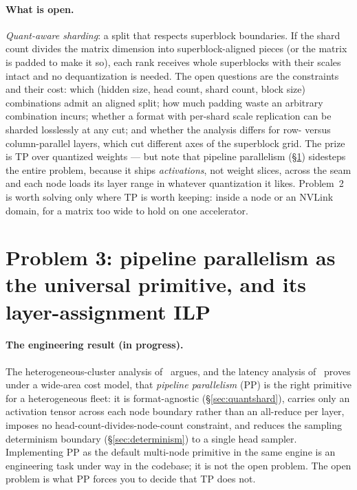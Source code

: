\documentclass[11pt]{article}
\begin{document}
\paragraph{What is open.} \emph{Quant-aware sharding}: a split that respects superblock boundaries. If the
shard count divides the matrix dimension into superblock-aligned pieces (or the matrix is padded to make
it so), each rank receives whole superblocks with their scales intact and no dequantization is needed. The
open questions are the constraints and their cost: which (hidden size, head count, shard count, block size)
combinations admit an aligned split; how much padding waste an arbitrary combination incurs; whether a
format with per-shard scale replication can be sharded losslessly at any cut; and whether the analysis
differs for row- versus column-parallel layers, which cut different axes of the superblock grid. The prize
is TP over quantized weights --- but note that pipeline parallelism (\S\ref{sec:pp}) sidesteps the entire
problem, because it ships \emph{activations}, not weight slices, across the seam and each node loads its
layer range in whatever quantization it likes. Problem~2 is worth solving only where TP is worth keeping:
inside a node or an NVLink domain, for a matrix too wide to hold on one accelerator.

\section{Problem 3: pipeline parallelism as the universal primitive, and its layer-assignment ILP}
\label{sec:pp}

\paragraph{The engineering result (in progress).} The heterogeneous-cluster analysis of~\cite{het} argues,
and the latency analysis of~\cite{latency} proves under a wide-area cost model, that \emph{pipeline
parallelism} (PP) is the right primitive for a heterogeneous fleet: it is format-agnostic (\S\ref{sec:quantshard}),
carries only an activation tensor across each node boundary rather than an all-reduce per layer, imposes no
head-count-divides-node-count constraint, and reduces the sampling determinism boundary
(\S\ref{sec:determinism}) to a single head sampler. Implementing PP as the default multi-node primitive in
the same engine is an engineering task under way in the codebase; it is not the open problem. The open
problem is what PP forces you to decide that TP does not.
\end{document}
